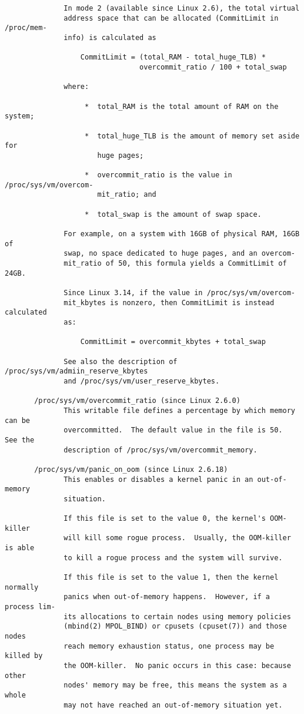 \documentclass[]{article}
\begin{document}
\begin{verbatim}
              In mode 2 (available since Linux 2.6), the total virtual
              address space that can be allocated (CommitLimit in /proc/mem‐
              info) is calculated as

                  CommitLimit = (total_RAM - total_huge_TLB) *
                                overcommit_ratio / 100 + total_swap

              where:

                   *  total_RAM is the total amount of RAM on the system;

                   *  total_huge_TLB is the amount of memory set aside for
                      huge pages;

                   *  overcommit_ratio is the value in /proc/sys/vm/overcom‐
                      mit_ratio; and

                   *  total_swap is the amount of swap space.

              For example, on a system with 16GB of physical RAM, 16GB of
              swap, no space dedicated to huge pages, and an overcom‐
              mit_ratio of 50, this formula yields a CommitLimit of 24GB.

              Since Linux 3.14, if the value in /proc/sys/vm/overcom‐
              mit_kbytes is nonzero, then CommitLimit is instead calculated
              as:

                  CommitLimit = overcommit_kbytes + total_swap

              See also the description of /proc/sys/vm/admiin_reserve_kbytes
              and /proc/sys/vm/user_reserve_kbytes.

       /proc/sys/vm/overcommit_ratio (since Linux 2.6.0)
              This writable file defines a percentage by which memory can be
              overcommitted.  The default value in the file is 50.  See the
              description of /proc/sys/vm/overcommit_memory.

       /proc/sys/vm/panic_on_oom (since Linux 2.6.18)
              This enables or disables a kernel panic in an out-of-memory
              situation.

              If this file is set to the value 0, the kernel's OOM-killer
              will kill some rogue process.  Usually, the OOM-killer is able
              to kill a rogue process and the system will survive.

              If this file is set to the value 1, then the kernel normally
              panics when out-of-memory happens.  However, if a process lim‐
              its allocations to certain nodes using memory policies
              (mbind(2) MPOL_BIND) or cpusets (cpuset(7)) and those nodes
              reach memory exhaustion status, one process may be killed by
              the OOM-killer.  No panic occurs in this case: because other
              nodes' memory may be free, this means the system as a whole
              may not have reached an out-of-memory situation yet.


\end{verbatim}
\end{document}
